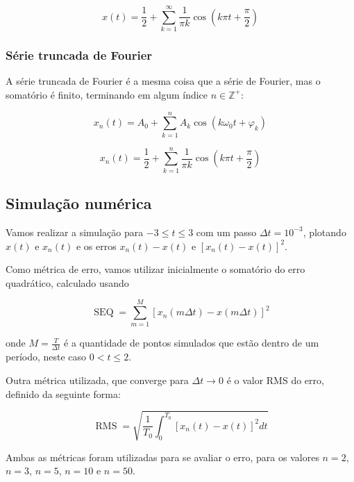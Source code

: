 \documentclass[10pt,twocolumn]{article}
\newcommand{\op}[1]{\operatorname{#1}}
\newcommand{\Z}{\mathbb{Z}}
\newcommand{\?}{\stackrel{?}{=}}
\begin{document}
\begin{equation*}
	x(t)=\frac{1}{2}+\sum_{k=1}^{\infty}\frac{1}{\pi k}\cos\left(k\pi t+\frac{\pi}{2}\right)
\end{equation*}

\subsubsection{Série truncada de Fourier}

A série truncada de Fourier é a mesma coisa que a série de Fourier, mas o somatório é finito, terminando em algum índice $n\in\Z^+$:

\begin{equation*}
	x_n(t)=A_0+\sum_{k=1}^{n}A_k\cos\left(k\omega_0t+\varphi_k\right)
\end{equation*}

\begin{equation*}
	x_n(t)=\frac{1}{2}+\sum_{k=1}^{n}\frac{1}{\pi k}\cos\left(k\pi t+\frac{\pi}{2}\right)
\end{equation*}

\subsection{Simulação numérica}

Vamos realizar a simulação para $-3\leq t\leq3$ com um passo $\Delta t=10^{-3}$, plotando $x(t)$ e $x_n(t)$ e os erros $x_n(t)-x(t)$ e $\left[x_n(t)-x(t)\right]^2$.

Como métrica de erro, vamos utilizar inicialmente o somatório do erro quadrático, calculado usando

\begin{equation*}
	\op{SEQ}=\sum_{m=1}^{M}\left[x_n(m\Delta t)-x(m\Delta t)\right]^2
\end{equation*}

\noindent
onde $M=\frac{T}{\Delta t}$ é a quantidade de pontos simulados que estão dentro de um período, neste caso $0<t\leq2$.

Outra métrica utilizada, que converge para $\Delta t\to0$ é o valor RMS do erro, definido da seguinte forma:

\begin{equation*}
	\op{RMS}=\sqrt{\frac{1}{T_0}\int_{0}^{T_0}\left[x_n(t)-x(t)\right]^2dt}
\end{equation*}

Ambas as métricas foram utilizadas para se avaliar o erro, para os valores $n=2$, $n=3$, $n=5$, $n=10$ e $n=50$.
\FloatBarrier
\end{document}
